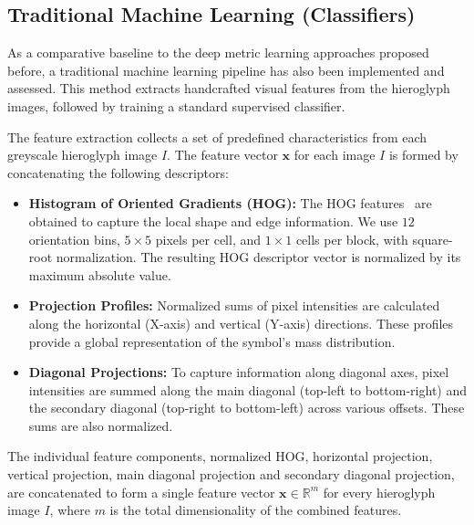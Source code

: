 \documentclass[10pt,onecolumn,letterpaper]{article}
\begin{document}
\subsection{Traditional Machine Learning (Classifiers)}

As a comparative baseline to the deep metric learning approaches proposed before, a traditional machine learning pipeline has also been implemented and assessed. This method extracts handcrafted visual features from the hieroglyph images, followed by training a standard supervised classifier.

The feature extraction collects a set of predefined characteristics from each greyscale hieroglyph image $I$. The feature vector $\mathbf{x}$ for each image $I$ is formed by concatenating the following descriptors:

\begin{itemize}
	\item \textbf{Histogram of Oriented Gradients (HOG):} The HOG features~\cite{dalal2005} are obtained to capture the local shape and edge information. We use $12$ orientation bins, $5 \times 5$ pixels per cell, and $1 \times 1$ cells per block, with square-root normalization. The resulting HOG descriptor vector is normalized by its maximum absolute value.
	
	\item \textbf{Projection Profiles:} Normalized sums of pixel intensities are calculated along the horizontal (X-axis) and vertical (Y-axis) directions. These profiles provide a global representation of the symbol's mass distribution.
	
	\item \textbf{Diagonal Projections:} To capture information along diagonal axes, pixel intensities are summed along the main diagonal (top-left to bottom-right) and the secondary diagonal (top-right to bottom-left) across various offsets. These sums are also normalized.
\end{itemize}

The individual feature components, normalized HOG, horizontal projection, vertical projection, main diagonal projection and secondary diagonal projection, are concatenated to form a single feature vector $\mathbf{x} \in \mathbb{R}^m$ for every hieroglyph image $I$, where $m$ is the total dimensionality of the combined features.
\end{document}
